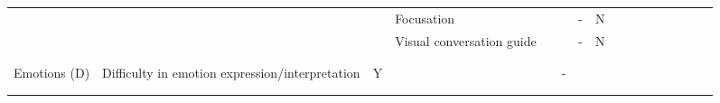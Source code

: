 \documentclass[man]{apa7}
\begin{document}
\begin{landscape}
\begin{table}[]
\begin{tabular}{llllllllllllllll}
                                                         &                                                            &                                          & Focusation                                            &                                                        &             & -           & N                               &  &  &  &  &  &  &  &  \\
                                                         &                                                            &                                          & Visual conversation guide                             &                                                        &             & -           & N                               &  &  &  &  &  &  &  &  \\
                                                         &                                                            &                                          &                                                       &                                                        &             &             &                                 &  &  &  &  &  &  &  &  \\
                                                         &                                                            &                                          &                                                       &                                                        &             &             &                                 &  &  &  &  &  &  &  &  \\
Emotions (D)                                             & Difficulty in emotion expression/interpretation            & Y                                        &                                                       &                                                        & -           &             &                                 &  &  &  &  &  &  &  &  \\
                                                         &                                                            &                                          &                                                       &                                                        &             &             &                                 &  &  &  &  &  &  &  &  \\
                                                         &                                                            &                                          &                                                       &                                                        &             &             &                                 &  &  &  &  &  &  &  &  \\

\end{tabular}
\end{table}
\end{landscape}
\end{document}
